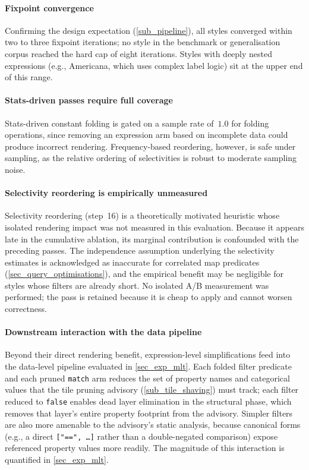 \paragraph{Fixpoint convergence}
Confirming the design expectation (\cref{sub_pipeline}), all styles converged within two to three fixpoint iterations; no style in the benchmark or generalisation corpus reached the hard cap of eight iterations.
Styles with deeply nested expressions (e.g., Americana, which uses complex label logic) sit at the upper end of this range.

\paragraph{Stats-driven passes require full coverage}
Stats-driven constant folding is gated on a sample rate of~$1.0$ for folding operations, since removing an expression arm based on incomplete data could produce incorrect rendering.
Frequency-based reordering, however, is safe under sampling, as the relative ordering of selectivities is robust to moderate sampling noise.

\paragraph{Selectivity reordering is empirically unmeasured}
Selectivity reordering (step~16) is a theoretically motivated heuristic whose isolated rendering impact was not measured in this evaluation.
Because it appears late in the cumulative ablation, its marginal contribution is confounded with the preceding passes.
The independence assumption underlying the selectivity estimates is acknowledged as inaccurate for correlated map predicates (\cref{sec_query_optimisations}), and the empirical benefit may be negligible for styles whose filters are already short.
No isolated A/B measurement was performed; the pass is retained because it is cheap to apply and cannot worsen correctness.

\paragraph{Downstream interaction with the data pipeline}
Beyond their direct rendering benefit, expression-level simplifications feed into the data-level pipeline evaluated in \cref{sec_exp_mlt}.
Each folded filter predicate and each pruned \texttt{match} arm reduces the set of property names and categorical values that the tile pruning advisory (\cref{sub_tile_shaving}) must track; each filter reduced to \texttt{false} enables dead layer elimination in the structural phase, which removes that layer's entire property footprint from the advisory.
Simpler filters are also more amenable to the advisory's static analysis, because canonical forms (e.g., a direct \texttt{["==",~\ldots]} rather than a double-negated comparison) expose referenced property values more readily.
The magnitude of this interaction is quantified in \cref{sec_exp_mlt}.


